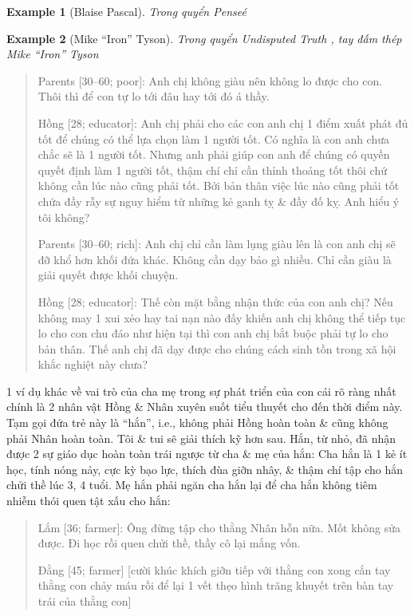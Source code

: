 \documentclass[12pt,twoside]{book}
\newtheorem{example}{Example}
\begin{document}
\begin{example}[\sc Blaise Pascal]\rm
	Trong quyển {\it Pense\'e} \cite{Pascal_pensees}
\end{example}

\begin{example}[\sc Mike ``Iron'' Tyson]\rm
	Trong quyển {\it Undisputed Truth} \cite{Tyson_Sloman2013}, tay đấm thép Mike ``Iron'' Tyson
\end{example}

\begin{quote}
	{\sf Parents [30--60; poor]}: Anh chị không giàu nên không lo được cho con. Thôi thì để con tự lo tới đâu hay tới đó á thầy.
	
	{\sf Hồng [28; educator]}: Anh chị phải cho các con anh chị 1 điểm xuất phát đủ tốt để chúng có thể lựa chọn làm 1 người tốt. Có nghĩa là con anh chưa chắc sẽ là 1 người tốt. Nhưng anh phải giúp con anh để chúng có quyền quyết định làm 1 người tốt, thậm chí chỉ cần thỉnh thoảng tốt thôi chứ không cần lúc nào cũng phải tốt. Bởi bản thân việc lúc nào cũng phải tốt chứa đầy rẫy sự nguy hiểm từ những kẻ ganh tỵ \& đầy đố kỵ. Anh hiểu ý tôi không?
	
	{\sf Parents [30--60; rich]}: Anh chị chỉ cần làm lụng giàu lên là con anh chị sẽ đỡ khổ hơn khối đứa khác. Không cần dạy bảo gì nhiều. Chỉ cần giàu là giải quyết được khối chuyện.
	
	{\sf Hồng [28; educator]}: Thế còn mặt bằng nhận thức của con anh chị? Nếu không may 1 xui xẻo hay tai nạn nào đấy khiến anh chị không thể tiếp tục lo cho con chu đáo như hiện tại thì con anh chị bắt buộc phải tự lo cho bản thân. Thế anh chị đã dạy được cho chúng cách sinh tồn trong xã hội khắc nghiệt này chưa?
\end{quote}
1 ví dụ khác về vai trò của cha mẹ trong sự phát triển của con cái rõ ràng nhất chính là 2 nhân vật {\sf Hồng} \& {\sf Nhân} xuyên suốt tiểu thuyết cho đến thời điểm này. Tạm gọi đứa trẻ này là ``hắn'', i.e., không phải {\sf Hồng} hoàn toàn \& cũng không phải {\sf Nhân} hoàn toàn. Tôi \& tui sẽ giải thích kỹ hơn sau. Hắn, từ nhỏ, đã nhận được 2 sự giáo dục hoàn toàn trái ngược từ cha \& mẹ của hắn:
Cha hắn là 1 kẻ ít học, tính nóng nảy, cực kỳ bạo lực, thích đùa giỡn nhây, \& thậm chí tập cho hắn chửi thề lúc 3, 4 tuổi. Mẹ hắn phải ngăn cha hắn lại để cha hắn không tiêm nhiễm thói quen tật xấu cho hắn:
\begin{quote}
	{\sf Lắm [36; farmer]}: Ông đừng tập cho thằng {\sf Nhân} hỗn nữa. Mốt không sửa được. Đi học rồi quen chửi thề, thầy cô lại mắng vốn.
	
	{\sf Đằng [45; farmer]} [cười khúc khích giỡn tiếp với thằng con xong cắn tay thằng con chảy máu rồi để lại 1 vết thẹo hình trăng khuyết trên bàn tay trái của thằng con]
\end{quote}
\end{document}

